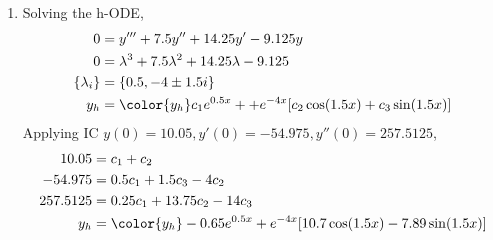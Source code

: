 \begin{enumerate}
    \item Solving the h-ODE,
          \begin{align}
              0               & = y''' + 7.5y'' + 14.25y' - 9.125y                    \\
              0               & = \lambda^{3} + 7.5\lambda^{2} + 14.25\lambda - 9.125 \\
              \{\lambda_{i}\} & = \{0.5, -4 \pm 1.5i\}                                \\
              y_{h}           & = \color{y_h} c_{1}e^{0.5x} +
              + e^{-4x}[c_{2}\cos(1.5x) + c_{3}\sin(1.5x)]
          \end{align}
          Applying IC $ y(0) = 10.05, y'(0) = -54.975, y''(0) = 257.5125 $,
          \begin{align}
              10.05    & = c_{1} + c_{2}                                      \\
              -54.975  & = 0.5c_{1} + 1.5c_{3} - 4c_{2}                       \\
              257.5125 & = 0.25c_{1} + 13.75c_{2} - 14c_{3}                   \\
              y_{h}    & = \color{y_h} -0.65e^{0.5x} + e^{-4x}[10.7\cos(1.5x)
                      - 7.89\sin(1.5x)]
          \end{align}
          \begin{figure}[H]
              \centering
          \end{figure}


\end{enumerate}
